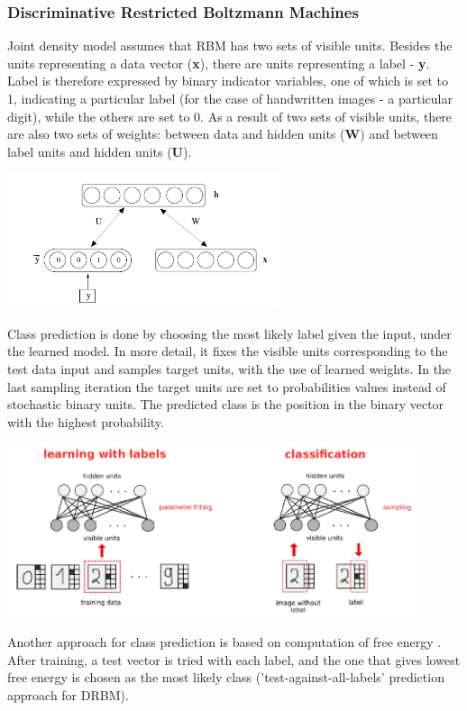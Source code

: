 \documentclass[a4paper]{scrartcl}
\begin{document}
\subsubsection{Discriminative Restricted Boltzmann Machines}
Joint density model assumes that RBM has two sets of visible units. Besides the units representing a data vector ({\bfseries x}), there are units representing a label - {\bfseries y}. Label is therefore expressed by binary indicator variables, one of which is set to 1, indicating a particular label (for the case of handwritten images - a particular digit), while the others are set to 0. 
As a result of two sets of visible units, there are also two sets of weights: between data and hidden units ({\bfseries W}) and between label units and hidden units ({\bfseries U}). 
\begin{center}
\includegraphics[width=8cm]{images/jointProbModel2.png}
\end{center}

\par Class prediction is done by choosing the most likely label given the input, under the learned model. In more detail, it fixes the visible units corresponding to the test data input and samples target units, with the use of learned weights. In the last sampling iteration the target units are set to probabilities values instead of stochastic binary units. The predicted class is the position in the binary vector with the highest probability. 
\begin{center}
\includegraphics[width=12cm]{images/DRBM.png}
\end{center}
Another approach for class prediction is based on computation of free energy \cite{Hinton}. After training, a test vector is tried with each label, and the one that gives lowest free energy is chosen as the most likely class ('test-against-all-labels' prediction approach for DRBM).
 
\end{document}
